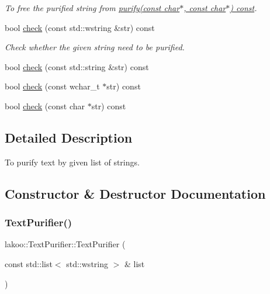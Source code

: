 \begin{DoxyCompactItemize}
\begin{DoxyCompactList}\small\item\em To free the purified string from \hyperlink{classlakoo_1_1_text_purifier_aacd5ea50d3d7cb6e800e40252fbc617b}{purify(const char$\ast$, const char$\ast$) const}. \end{DoxyCompactList}\item 
bool \hyperlink{classlakoo_1_1_text_purifier_a243df60bae7d8d98a289dbe5c0f85e89}{check} (const std\+::wstring \&str) const
\begin{DoxyCompactList}\small\item\em Check whether the given string need to be purified. \end{DoxyCompactList}\item 
bool \hyperlink{classlakoo_1_1_text_purifier_a7448ae6b4505878099d20e18ad410189}{check} (const std\+::string \&str) const
\item 
bool \hyperlink{classlakoo_1_1_text_purifier_a866cf8a31c43496db79eac05b334dbf3}{check} (const wchar\+\_\+t $\ast$str) const
\item 
bool \hyperlink{classlakoo_1_1_text_purifier_a2cf26b4a8fcb5cf8ea4b4598e56771dd}{check} (const char $\ast$str) const
\end{DoxyCompactItemize}


\subsection{Detailed Description}
To purify text by given list of strings. 

\subsection{Constructor \& Destructor Documentation}
\mbox{\label{classlakoo_1_1_text_purifier_aabaa9cc28934e9ef8a930d6e821efdf3}} 
\subsubsection{\texorpdfstring{Text\+Purifier()}{TextPurifier()}\hspace{0.1cm}{\footnotesize\ttfamily [1/4]}}
{\footnotesize\ttfamily lakoo\+::\+Text\+Purifier\+::\+Text\+Purifier (\begin{DoxyParamCaption}\item[{const std\+::list$<$ std\+::wstring $>$ \&}]{list }\end{DoxyParamCaption})\hspace{0.3cm}{\ttfamily [explicit]}}




